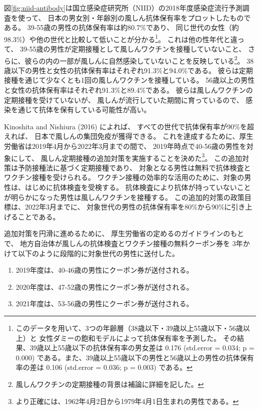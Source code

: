 \documentclass[
  11pt,
  a4paper,
]{article}
\providecommand{\tightlist}{%
  \setlength{\itemsep}{0pt}\setlength{\parskip}{0pt}}
\begin{document}
図\ref{fig:niid-antibody}は国立感染症研究所（NIID）の2018年度感染症流行予測調査を使って、
日本の男女別・年齢別の風しん抗体保有率をプロットしたものである。
39-55歳の男性の抗体保有率は約80.7\%であり、
同じ世代の女性（約98.3\%）や他の世代と比較して低いことが分かる\footnote{このデータを用いて、3つの年齢層（38歳以下・39歳以上55歳以下・56歳以上）と
  女性ダミーの飽和モデルによって抗体保有率を予測した。
  その結果、39歳以上55歳以下の抗体保有率の男女差は
  0.176 (std.error = 0.034; p = 0.000)
  である。また、39歳以上55歳以下の男性と56歳以上の男性の抗体保有率の差は
  0.106 (std.error = 0.036; p = 0.003)
  である。}。
これは他の性年代と違って、
39-55歳の男性が定期接種として風しんワクチンを接種していないこと、
さらに、彼らの内の一部が風しんに自然感染していないことを反映している\footnote{風しんワクチンの定期接種の背景は補論に詳細を記した。}。
38歳以下の男性と女性の抗体保有率はそれぞれ91.3\%と94.0\%である。
彼らは定期接種を通じて少なくとも1回の風しんワクチンを接種している。
56歳以上の男性と女性の抗体保有率はそれぞれ91.3\%と89.4\%である。
彼らは風しんワクチンの定期接種を受けていないが、
風しんが流行していた期間に育っているので、
感染を通じて抗体を保有している可能性が高い。

Kinoshita and Nishiura (2016) によれば、
すべての世代で抗体保有率が90\%を超えれば、
日本で風しんの集団免疫が獲得できる。
これを達成するために、厚生労働省は2019年4月から2022年3月までの間で、
2019年時点で40-56歳の男性を対象にして、
風しん定期接種の追加対策を実施することを決めた\footnote{より正確には、1962年4月2日から1979年4月1日生まれの男性である。}。
この追加対策は予防接種法に基づく定期接種であり、
対象となる男性は無料で抗体検査とワクチン接種を受けられる。
ワクチン接種の効率的な活用のために、対象の男性は、はじめに抗体検査を受検する。
抗体検査により抗体が持っていないことが明らかになった男性は風しんワクチンを接種する。
この追加的対策の政策目標は、2022年3月までに、
対象世代の男性の抗体保有率を80\%から90\%に引き上げることである。

追加対策を円滑に進めるために、
厚生労働省の定めるのガイドラインのもとで、
地方自治体が風しんの抗体検査とワクチン接種の無料クーポン券を
3年かけて以下のように段階的に対象世代の男性に送付した。

\begin{enumerate}
\def\labelenumi{\arabic{enumi}.}
\tightlist
\item
  2019年度は、40-46歳の男性にクーポン券が送付される。
\item
  2020年度は、47-52歳の男性にクーポン券が送付される。
\item
  2021年度は、53-56歳の男性にクーポン券が送付される。
\end{enumerate}
\end{document}
